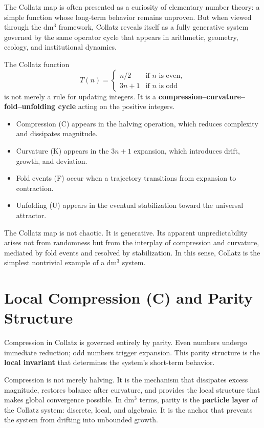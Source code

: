\documentclass[14pt, twoside, openright]{book}
\theoremstyle{definition}
\theoremstyle{remark}
\begin{document}
The Collatz map is often presented as a curiosity of elementary number theory:
a simple function whose long-term behavior remains unproven. But when viewed
through the dm$^{3}$ framework, Collatz reveals itself as a fully generative
system governed by the same operator cycle that appears in arithmetic, geometry,
ecology, and institutional dynamics.

The Collatz function
\[
  T(n) = \begin{cases}
    n/2   & \text{if } n \text{ is even},\\
    3n+1  & \text{if } n \text{ is odd}
  \end{cases}
\]
is not merely a rule for updating integers. It is a
\textbf{compression--curvature--fold--unfolding cycle} acting on the positive
integers.

\begin{itemize}[leftmargin=2em]
  \item Compression (C) appears in the halving operation, which reduces complexity
        and dissipates magnitude.
  \item Curvature (K) appears in the $3n+1$ expansion, which introduces drift,
        growth, and deviation.
  \item Fold events (F) occur when a trajectory transitions from expansion to
        contraction.
  \item Unfolding (U) appears in the eventual stabilization toward the universal
        attractor.
\end{itemize}

The Collatz map is not chaotic. It is generative. Its apparent unpredictability
arises not from randomness but from the interplay of compression and curvature,
mediated by fold events and resolved by stabilization. In this sense, Collatz is
the simplest nontrivial example of a dm$^{3}$ system.

\section{Local Compression (C) and Parity Structure}

Compression in Collatz is governed entirely by parity. Even numbers undergo
immediate reduction; odd numbers trigger expansion. This parity structure is the
\textbf{local invariant} that determines the system's short-term behavior.

Compression is not merely halving. It is the mechanism that dissipates excess
magnitude, restores balance after curvature, and provides the local structure
that makes global convergence possible. In dm$^{3}$ terms, parity is the
\textbf{particle layer} of the Collatz system: discrete, local, and algebraic.
It is the anchor that prevents the system from drifting into unbounded growth.
\end{document}
